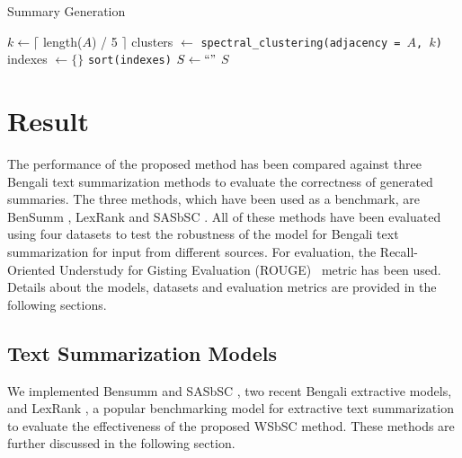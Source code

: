 \documentclass[acmlarge]{acmart}
\begin{document}
\begin{algorithm}[]
	\caption{Summary Generation}
	\label{alg:summary}
	\SetAlgoLined
	$k \gets \lceil$ length($A$) / 5 $\rceil$\;
	clusters $\gets$ \texttt{spectral\_clustering(adjacency = $A$, $k$)}\;
	indexes $\gets \{\}$\;
	\texttt{sort(indexes)}\;
	$S \gets `` "$\;
	\Return $S$\;
\end{algorithm}
\section{Result}\label{sec:result}
The performance of the proposed method has been compared against three Bengali text summarization methods to evaluate the correctness of generated summaries. The three methods, which have been used as a benchmark, are BenSumm \cite{chowdhury-etal-2021-tfidf-clustering}, LexRank \cite{Erkan-lexRank-2004} and SASbSC \cite{roychowdhury-etal-2022-spectral-base}. All of these methods have been evaluated using four datasets to test the robustness of the model for Bengali text summarization for input from different sources. For evaluation, the Recall-Oriented Understudy for Gisting Evaluation (ROUGE)~\cite{lin-2004-rouge} metric has been used. Details about the models, datasets and evaluation metrics are provided in the following sections.
\subsection{Text Summarization Models}\label{subsec:text-summarization-models}
We implemented Bensumm \cite{chowdhury-etal-2021-tfidf-clustering} and SASbSC \cite{roychowdhury-etal-2022-spectral-base}, two recent Bengali extractive models, and LexRank \cite{Erkan-lexRank-2004}, a popular benchmarking model for extractive text summarization to evaluate the effectiveness of the proposed WSbSC method. These methods are further discussed in the following section.
\end{document}
